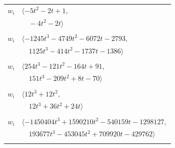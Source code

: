 \documentclass[11pt]{article}
\begin{document}
\begin{longtable}{@{}ll@{}}
$w_i$ & $\langle -5t^{2}-2t+1,$\\
 & $\quad -4t^{2}-2t\rangle$\\
\addlinespace[2pt]
\multicolumn{2}{@{}p{0.97\textwidth}@{}}{$i=19$, $D_i=32$, $\rho_{ij}$: $3{:}2, \allowbreak 6{:}2, \allowbreak 14{:}2, \allowbreak 30{:}1, \allowbreak 31{:}1, \allowbreak 35{:}2, \allowbreak 37{:}2, \allowbreak 42{:}2, \allowbreak 46{:}1, \allowbreak 49{:}1, \allowbreak 53{:}2, \allowbreak 60{:}1, \allowbreak 65{:}1, \allowbreak 67{:}2$}\\
$w_i$ & $\langle -1245t^{3}-4749t^{2}-6072t-2793,$\\
 & $\quad 1125t^{3}-414t^{2}-1737t-1386\rangle$\\
\addlinespace[2pt]
\multicolumn{2}{@{}p{0.97\textwidth}@{}}{$i=20$, $D_i=8$, $\rho_{ij}$: $1{:}2, \allowbreak 5{:}2, \allowbreak 7{:}1, \allowbreak 12{:}1, \allowbreak 26{:}2, \allowbreak 28{:}2, \allowbreak 30{:}1, \allowbreak 34{:}1, \allowbreak 36{:}1, \allowbreak 39{:}2, \allowbreak 41{:}1, \allowbreak 43{:}1, \allowbreak 44{:}1, \allowbreak 59{:}1$}\\
$w_i$ & $\langle 254t^{3}-121t^{2}-164t+91,$\\
 & $\quad 151t^{3}-209t^{2}+8t-70\rangle$\\
\addlinespace[2pt]
\multicolumn{2}{@{}p{0.97\textwidth}@{}}{$i=21$, $D_i=2$, $\rho_{ij}$: $12{:}1, \allowbreak 16{:}2, \allowbreak 30{:}2, \allowbreak 43{:}1, \allowbreak 46{:}2, \allowbreak 49{:}1, \allowbreak 52{:}2, \allowbreak 60{:}2, \allowbreak 68{:}1$}\\
$w_i$ & $\langle 12t^{3}+12t^{2},$\\
 & $\quad 12t^{3}+36t^{2}+24t\rangle$\\
\addlinespace[2pt]
\multicolumn{2}{@{}p{0.97\textwidth}@{}}{$i=22$, $D_i=64$, $\rho_{ij}$: $6{:}1, \allowbreak 10{:}1, \allowbreak 11{:}2, \allowbreak 15{:}2, \allowbreak 16{:}1, \allowbreak 23{:}2, \allowbreak 28{:}2, \allowbreak 30{:}2, \allowbreak 37{:}1, \allowbreak 40{:}2, \allowbreak 41{:}2, \allowbreak 47{:}1, \allowbreak 54{:}2, \allowbreak 57{:}2, \allowbreak 59{:}2, \allowbreak 63{:}2, \allowbreak 64{:}1$}\\
$w_i$ & $\langle -1450404t^{3}+1590210t^{2}-540159t-1298127,$\\
 & $\quad 193677t^{3}-453045t^{2}+709920t-429762\rangle$\\
\addlinespace[2pt]
\multicolumn{2}{@{}p{0.97\textwidth}@{}}{$i=23$, $D_i=16$, $\rho_{ij}$: $10{:}1, \allowbreak 13{:}2, \allowbreak 17{:}2, \allowbreak 22{:}1, \allowbreak 32{:}1, \allowbreak 36{:}2, \allowbreak 38{:}1, \allowbreak 39{:}1, \allowbreak 43{:}2, \allowbreak 51{:}1, \allowbreak 52{:}1, \allowbreak 61{:}2, \allowbreak 62{:}1, \allowbreak 65{:}2, \allowbreak 66{:}1, \allowbreak 68{:}2$}\\

\end{longtable}
\end{document}
